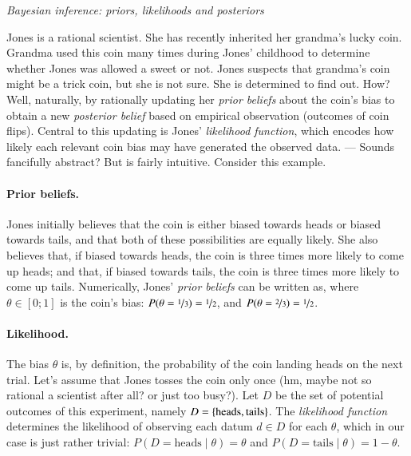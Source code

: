 \documentclass[nobib]{tufte-handout}
\begin{document}
\begin{InfoBox}[t]
\centering
\colorbox{mygray}{\centering
  \begin{minipage}{1.0\textwidth}

    \emph{Bayesian inference: priors, likelihoods and posteriors}
    \medskip

    Jones is a rational scientist. She has recently inherited her grandma's lucky coin. Grandma
    used this coin many times during Jones' childhood to determine whether Jones was allowed a
    sweet or not. Jones suspects that grandma's coin might be a trick coin, but she is not
    sure. She is determined to find out. How? Well, naturally, by rationally updating her
    \emph{prior beliefs} about the coin's bias to obtain a new \emph{posterior belief} based on
    empirical observation (outcomes of coin flips). Central to this updating is Jones'
    \emph{likelihood function}, which encodes how likely each relevant coin bias may have
    generated the observed data. --- Sounds fancifully abstract? But is fairly intuitive.
    Consider this example.
    
    \paragraph{Prior beliefs.} Jones initially believes that the coin is either biased towards
    heads or biased towards tails, and that both of these possibilities are equally likely. She
    also believes that, if biased towards heads, the coin is three times more likely to come up
    heads; and that, if biased towards tails, the coin is three times more likely to come up
    tails. Numerically, Jones' \emph{prior beliefs} can be written as, where $\theta \in [0;1]$
    is the coin's bias: $P(\theta = \nicefrac{1}{3}) = \nicefrac{1}{2}$, and $P(\theta =
    \nicefrac{2}{3}) = \nicefrac{1}{2}$.

    \paragraph{Likelihood.} The bias $\theta$ is, by definition, the probability of the coin
    landing heads on the next trial. Let's assume that Jones tosses the coin only once (hm,
    maybe not so rational a scientist after all? or just too busy?). Let $D$ be the set of
    potential outcomes of this experiment, namely $D = \left\{\text{heads}, \text{tails}\right\}$. The
    \emph{likelihood function} determines the likelihood of observing each datum $d \in D$ for
    each $\theta$, which in our case is just rather trivial: $P(D = \text{heads} \mid \theta) =
    \theta$ and $P(D = \text{tails} \mid \theta) = 1 - \theta$.


\end{minipage}}
\end{InfoBox}
\end{document}
